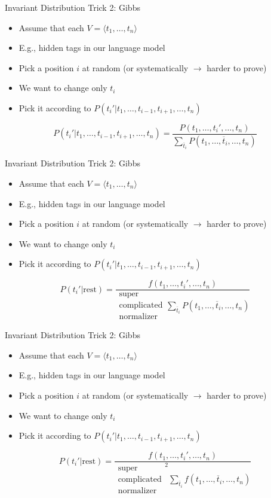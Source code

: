 \documentclass[11pt]{beamer}
\begin{document}
	\begin{frame}{Invariant Distribution Trick 2: Gibbs}
		\begin{itemize} 
			\item Assume that each $V = \langle t_1, \dots, t_n \rangle$
			\item E.g., hidden tags in our language model 
			\item Pick a position $i$ at random (or systematically $\rightarrow$ harder to prove)
			\item We want to change only $t_i$
			\item Pick it according to $P(t_{i}'|t_1,\dots,t_{i-1},t_{i+1},\dots,t_n)$
		\end{itemize}
		
		$$P(t_{i}'|t_1,\dots,t_{i-1},t_{i+1},\dots,t_n) = \frac{P(t_1,\dots,t_{i}',\dots,t_n)}{\sum_{\overline{t}_i} P(t_1,\dots,\overline{t}_{i},\dots,t_n)}$$
	\end{frame}
	
	\begin{frame}{Invariant Distribution Trick 2: Gibbs}
		\begin{itemize} 
			\item Assume that each $V = \langle t_1, \dots, t_n \rangle$
			\item E.g., hidden tags in our language model 
			\item Pick a position $i$ at random (or systematically $\rightarrow$ harder to prove)
			\item We want to change only $t_i$
			\item Pick it according to $P(t_{i}'|t_1,\dots,t_{i-1},t_{i+1},\dots,t_n)$
		\end{itemize}
		
		$$P(t_{i}'|\mbox{rest}) = \frac{f(t_1,\dots,t_{i}',\dots,t_n)}{\substack{\mbox{super} \\ \mbox{complicated} \\ \mbox{normalizer}} \sum_{\overline{t}_i} P(t_1,\dots,\overline{t}_{i},\dots,t_n)}$$
	\end{frame}	
	
	\begin{frame}{Invariant Distribution Trick 2: Gibbs}
			\begin{itemize} 
				\item Assume that each $V = \langle t_1, \dots, t_n \rangle$
				\item E.g., hidden tags in our language model 
				\item Pick a position $i$ at random (or systematically $\rightarrow$ harder to prove)
				\item We want to change only $t_i$
				\item Pick it according to $P(t_{i}'|t_1,\dots,t_{i-1},t_{i+1},\dots,t_n)$
			\end{itemize}
			
			$$P(t_{i}'|\mbox{rest}) = \frac{f(t_1,\dots,t_{i}',\dots,t_n)}{\substack{\mbox{super} \\ \mbox{complicated} \\ \mbox{normalizer}}^2 \sum_{\overline{t}_i} f(t_1,\dots,\overline{t}_{i},\dots,t_n)}$$
	\end{frame}
	
\end{document}
